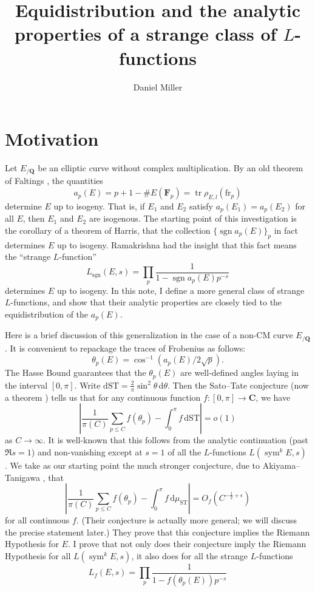 \documentclass{article}
\title{Equidistribution and the analytic properties of a strange class of 
$L$-functions}
\author{Daniel Miller}
\DeclareMathOperator{\sgn}{sgn}
\DeclareMathOperator{\sym}{sym}
\DeclareMathOperator{\tr}{tr}
\newcommand{\bC}{\mathbf{C}}
\newcommand{\bF}{\mathbf{F}}
\newcommand{\bQ}{\mathbf{Q}}
\newcommand{\dd}{\mathrm{d}}
\newcommand{\fr}{\mathrm{fr}}
\newcommand{\ST}{\mathrm{ST}}
\theoremstyle{definition}
\begin{document}
\maketitle





\section{Motivation}

Let $E_{/\bQ}$ be an elliptic curve without complex multiplication. By an old 
theorem of Faltings \cite{faltings-1983}, the quantities 
\[
	a_p(E) = p + 1 - \# E(\bF_p) = \tr \rho_{E,l} (\fr_p)
\]
determine $E$ up to isogeny. That is, if $E_1$ and $E_2$ satisfy 
$a_p(E_1)=a_p(E_2)$ for all $E$, then $E_1$ and $E_2$ are isogenous. The 
starting point of this investigation is the 
corollary of a theorem of Harris, that the collection $\{\sgn a_p(E)\}_p$ in 
fact determines $E$ up to isogeny. Ramakrishna had the insight that this fact 
means the ``strange $L$-function''
\[
	L_{\sgn}(E,s) = \prod_p \frac{1}{1-\sgn a_p(E) p^{-s}} 
\]
determines $E$ up to isogeny. In this note, I define a more general class of 
strange $L$-functions, and show that their analytic properties are closely 
tied to the equidistribution of the $a_p(E)$. 

Here is a brief discussion of this generalization in the case of a non-CM curve 
$E_{/\bQ}$. It is convenient to repackage the traces of Frobenius as follows:
\[
	\theta_p(E) = \cos^{-1}(a_p(E)/2\sqrt p) .
\]
The Hasse Bound guarantees that the $\theta_p(E)$ are well-defined angles 
laying in the interval $[0,\pi]$. Write 
$\dd\ST = \frac{2}{\pi} \sin^2\theta\, \dd\theta$. Then the Sato--Tate 
conjecture (now a theorem \cite{barnet-lamb-etal-2011}) tells us that for any 
continuous function $f\colon [0,\pi]\to \bC$, we have
\[
	\left| \frac{1}{\pi(C)} \sum_{p\leqslant C} f(\theta_p) - \int_0^\pi f\, \dd\ST\right| = o(1)
\]
as $C\to \infty$. It is well-known that this follows from the analytic 
continuation (past $\Re s=1$) and non-vanishing except at $s=1$ of all the 
$L$-functions $L(\sym^k E,s)$ \cite[A.1, Th.1]{serre-1968}. We take as our 
starting point the much stronger conjecture, due to Akiyama--Tanigawa 
\cite{akiyama-tanigawa}, that 
\[
	\left| \frac{1}{\pi(C)} \sum_{p\leqslant C} f(\theta_p) - \int_0^\pi f\, \dd \mu_\ST\right| = O_f(C^{-\frac 1 2+\epsilon}) 
\]
for all continuous $f$. (Their conjecture is actually more general; we will 
discuss the precise statement later.)
They prove that this conjecture implies the Riemann Hypothesis for $E$. I 
prove that not only does their conjecture imply the Riemann Hypothesis for all 
$L(\sym^k E,s)$, it also does for all the strange $L$-functions 
\[
	L_f(E,s) = \prod_p \frac{1}{1-f(\theta_p(E)) p^{-s}}
\]
\end{document}
